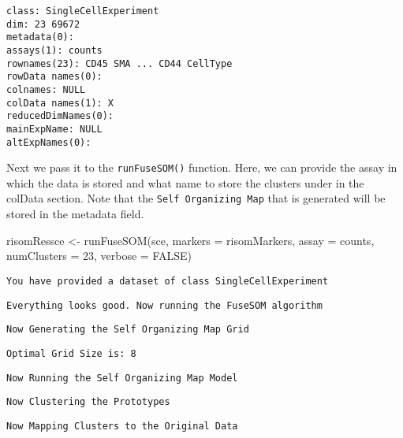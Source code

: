 \documentclass[
  letterpaper,
  DIV=11,
  numbers=noendperiod]{scrreprt}
\newenvironment{Shaded}{\begin{snugshade}}{\end{snugshade}}
\newcommand{\AttributeTok}[1]{\textcolor[rgb]{0.40,0.45,0.13}{#1}}
\newcommand{\ConstantTok}[1]{\textcolor[rgb]{0.56,0.35,0.01}{#1}}
\newcommand{\DecValTok}[1]{\textcolor[rgb]{0.68,0.00,0.00}{#1}}
\newcommand{\FunctionTok}[1]{\textcolor[rgb]{0.28,0.35,0.67}{#1}}
\newcommand{\NormalTok}[1]{\textcolor[rgb]{0.00,0.23,0.31}{#1}}
\newcommand{\OtherTok}[1]{\textcolor[rgb]{0.00,0.23,0.31}{#1}}
\newcommand{\StringTok}[1]{\textcolor[rgb]{0.13,0.47,0.30}{#1}}
\begin{document}
\begin{verbatim}
class: SingleCellExperiment 
dim: 23 69672 
metadata(0):
assays(1): counts
rownames(23): CD45 SMA ... CD44 CellType
rowData names(0):
colnames: NULL
colData names(1): X
reducedDimNames(0):
mainExpName: NULL
altExpNames(0):
\end{verbatim}

Next we pass it to the \texttt{runFuseSOM()} function. Here, we can
provide the assay in which the data is stored and what name to store the
clusters under in the colData section. Note that the
\texttt{Self\ Organizing\ Map} that is generated will be stored in the
metadata field.

\begin{Shaded}
\begin{Highlighting}[]
\NormalTok{risomRessce }\OtherTok{\textless{}{-}} \FunctionTok{runFuseSOM}\NormalTok{(sce, }\AttributeTok{markers =}\NormalTok{ risomMarkers, }\AttributeTok{assay =} \StringTok{\textquotesingle{}counts\textquotesingle{}}\NormalTok{, }
                      \AttributeTok{numClusters =} \DecValTok{23}\NormalTok{, }\AttributeTok{verbose =} \ConstantTok{FALSE}\NormalTok{)}
\end{Highlighting}
\end{Shaded}

\begin{verbatim}
You have provided a dataset of class SingleCellExperiment
\end{verbatim}

\begin{verbatim}
Everything looks good. Now running the FuseSOM algorithm
\end{verbatim}

\begin{verbatim}
Now Generating the Self Organizing Map Grid
\end{verbatim}

\begin{verbatim}
Optimal Grid Size is: 8
\end{verbatim}

\begin{verbatim}
Now Running the Self Organizing Map Model
\end{verbatim}

\begin{verbatim}
Now Clustering the Prototypes
\end{verbatim}

\begin{verbatim}
Now Mapping Clusters to the Original Data
\end{verbatim}
\end{document}
